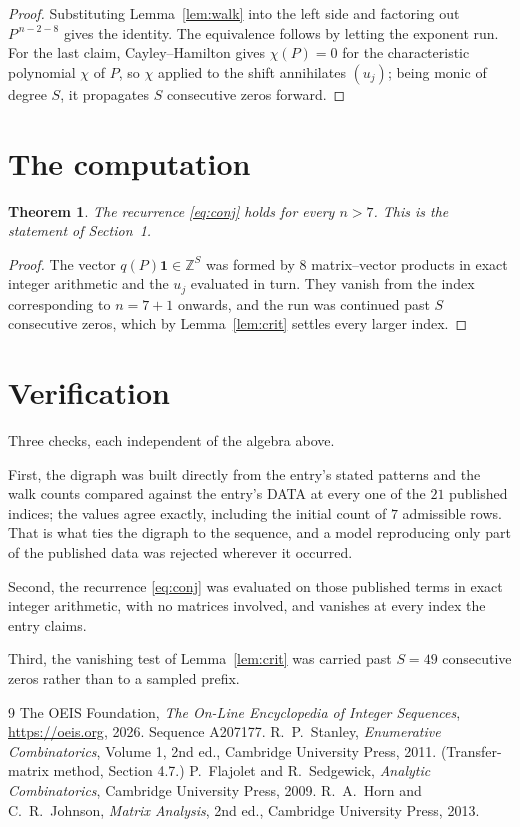 \documentclass[11pt,a4paper]{article}
\theoremstyle{plain}
\newtheorem{theorem}{Theorem}
\theoremstyle{definition}
\begin{document}
\begin{proof}
Substituting Lemma~\ref{lem:walk} into the left side and factoring out
$P^{\,n-2-8}$ gives the identity. The equivalence follows by letting the exponent
run. For the last claim, Cayley--Hamilton gives $\chi(P)=0$ for the characteristic
polynomial $\chi$ of $P$, so $\chi$ applied to the shift annihilates $(u_j)$; being monic of
degree $S$, it propagates $S$ consecutive zeros forward.
\end{proof}

\section{The computation}

\begin{theorem}
The recurrence \eqref{eq:conj} holds for every $n>7$. This is the statement of
Section~1.
\end{theorem}

\begin{proof}
The vector $q(P)\mathbf{1}\in\mathbb{Z}^{S}$ was formed by $8$ matrix--vector
products in exact integer arithmetic and the $u_j$ evaluated in turn. They vanish from the
index corresponding to $n=7+1$ onwards, and the run was continued past $S$ consecutive
zeros, which by Lemma~\ref{lem:crit} settles every larger index.
\end{proof}

\section{Verification}

Three checks, each independent of the algebra above.

First, the digraph was built directly from the entry's stated patterns and the walk counts
compared against the entry's DATA at every one of the $21$ published indices; the
values agree exactly, including the initial count of $7$ admissible rows. That is
what ties the digraph to the sequence, and a model reproducing only part of the published
data was rejected wherever it occurred.

Second, the recurrence \eqref{eq:conj} was evaluated on those published terms in exact
integer arithmetic, with no matrices involved, and vanishes at every index the entry claims.

Third, the vanishing test of Lemma~\ref{lem:crit} was carried past $S=49$ consecutive
zeros rather than to a sampled prefix.

\begin{thebibliography}{9}
 The OEIS Foundation, \emph{The On-Line Encyclopedia of Integer
Sequences}, \url{https://oeis.org}, 2026. Sequence A207177.
 R.~P.~Stanley, \emph{Enumerative Combinatorics}, Volume 1, 2nd ed.,
Cambridge University Press, 2011. (Transfer-matrix method, Section 4.7.)
 P.~Flajolet and R.~Sedgewick, \emph{Analytic Combinatorics}, Cambridge
University Press, 2009.
 R.~A.~Horn and C.~R.~Johnson, \emph{Matrix Analysis}, 2nd ed., Cambridge
University Press, 2013.
\end{thebibliography}
\end{document}
